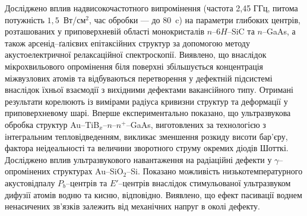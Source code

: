  Досліджено вплив надвисокочастотного випромінення (частота 2,45 ГГц, питома потужність  $1,5$~Вт/см$^2$, час обробки --- до 80~c) на параметри глибоких центрів, розташованих у приповерхневій області монокристалів $n$--6$H$--SiC та $n$--GaAs, а також арсенід--ґалієвих епітаксійних структур за допомогою методу акустоелектричної релаксаційної спектроскопії.
Виявлено, що внаслідок мікрохвильового опромінення біля поверхні збільшується концентрація міжвузлових атомів та відбуваються перетворення у дефектній підсистемі внаслідок їхньої взаємодії з вихідними дефектами вакансійного типу.
Отримані результати корелюють із вимірами радіуса кривизни структур та деформації у приповерхневому шарі.
Вперше експериментально показано, що ультразвукова обробка структур
Au--TiB$_x$--$n$--$n^+$--GaAs, виготовлених
за технологією з інтегральним тепловідведенням, викликає зменшення розкиду висоти бар'єру, фактора неідеальності та величини зворотного струму окремих діодів Шотткі.
Досліджено вплив ультразвукового навантаження
на радіаційні дефекти у $\gamma$--опромінених структурах Au--SiO$_2$--Si.
Показано можливість низькотемпературного акустовідпалу $P_b$--центрів
та $E'$--центрів
внаслідок стимульованої ультразвуком дифузії атомів водню та кисню, відповідно.
Виявлено, що ефект  пасивації воднем ненасичених зв'язків залежить
від механічних напруг в околі дефекту.





\vspace{0.7cm}
\noindent
\keywords

\vspace{2cm}




